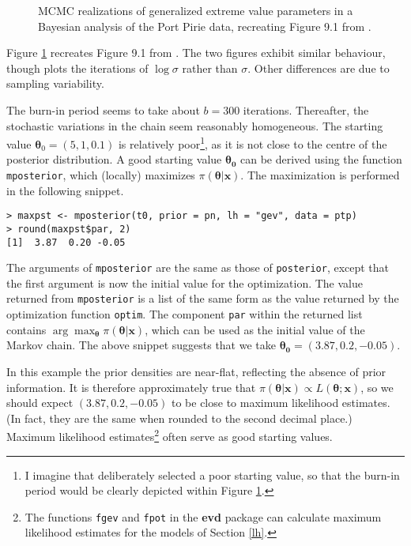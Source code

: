 \documentclass[11pt,a4paper]{article}
\newcommand{\bs}{\boldsymbol}
\begin{document}
\begin{figure}
\begin{center}
\vspace{-1.5cm}
\hspace{0cm}
\hspace{0cm}
\end{center}
\caption{MCMC realizations of generalized extreme value parameters in a Bayesian analysis of the Port Pirie data, recreating Figure 9.1 from \citet{cole01}.}
\label{pirietrace1}
\end{figure}

Figure \ref{pirietrace1} recreates Figure 9.1 from \citet{cole01}.
The two figures exhibit similar behaviour, though \citet{cole01} plots the iterations of $\log \sigma$ rather than $\sigma$. 
Other differences are due to sampling variability.

The burn-in period seems to take about $b=300$ iterations.
Thereafter, the stochastic variations in the chain seem reasonably homogeneous.
The starting value $\bs{\theta}_0 = (5,1,0.1)$ is relatively poor\footnote{I imagine that \citet{cole01} deliberately selected a poor starting value, so that the burn-in period would be clearly depicted within Figure \ref{pirietrace1}.}, as it is not close to the centre of the posterior distribution.
A good starting value $\bs{\theta_0}$ can be derived using the function \verb+mposterior+, which (locally) maximizes $\pi(\bs{\theta}|\bs{x})$. 
The maximization is performed in the following snippet.

\begin{verbatim}
> maxpst <- mposterior(t0, prior = pn, lh = "gev", data = ptp)
> round(maxpst$par, 2)
[1]  3.87  0.20 -0.05
\end{verbatim}

The arguments of \verb+mposterior+ are the same as those of \verb+posterior+, except that the first argument is now the initial value for the optimization.
The value returned from \verb+mposterior+ is a list of the same form as the value returned by the optimization function \verb+optim+.
The component \verb+par+ within the returned list contains $\arg\max_{\bs{\theta}} \pi(\bs{\theta}|\bs{x})$, which can be used as the initial value of the Markov chain.
The above snippet suggests that we take $\bs{\theta_0} = (3.87,0.2,-0.05)$.

In this example the prior densities are near-flat, reflecting the absence of prior information.
It is therefore approximately true that $\pi(\bs{\theta}|\bs{x}) \propto L(\bs{\theta};\bs{x})$, so we should expect $(3.87,0.2,-0.05)$ to be close to maximum likelihood estimates.
(In fact, they are the same when rounded to the second decimal place.) 
Maximum likelihood estimates\footnote{The functions \texttt{fgev} and \texttt{fpot} in the \textbf{evd} package can calculate maximum likelihood estimates for the models of Section \ref{lh}.} often serve as good starting values.
\end{document}
